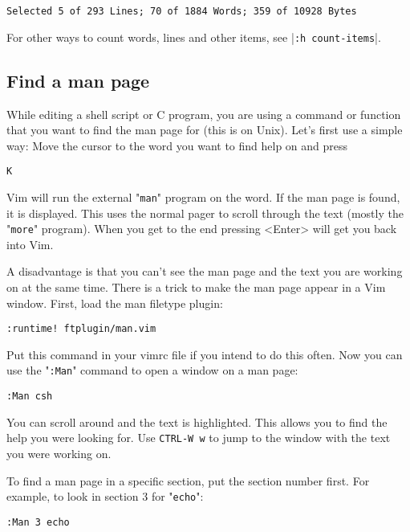 \begin{Verbatim}[samepage=true]
    Selected 5 of 293 Lines; 70 of 1884 Words; 359 of 10928 Bytes 
\end{Verbatim}

For other ways to count words, lines and other items, see |\verb!:h count-items!|.
\subsection{Find a man page}
\label{find-manpage}
While editing a shell script or C program, you are using a command or function that you want to find the man page for (this is on Unix).
Let's first use a simple way: Move the cursor to the word you want to find help on and press

\begin{Verbatim}[samepage=true]
 K
\end{Verbatim}

Vim will run the external "\verb!man!" program on the word.
If the man page is found, it is displayed.
This uses the normal pager to scroll through the text (mostly the "\verb!more!" program).
When you get to the end pressing <Enter> will get you back into Vim.

A disadvantage is that you can't see the man page and the text you are working on at the same time.
There is a trick to make the man page appear in a Vim window.
First, load the man filetype plugin:

\begin{Verbatim}[samepage=true]
 :runtime! ftplugin/man.vim
\end{Verbatim}

Put this command in your vimrc file if you intend to do this often.
Now you can use the "\verb!:Man!" command to open a window on a man page:

\begin{Verbatim}[samepage=true]
 :Man csh
\end{Verbatim}

You can scroll around and the text is highlighted.
This allows you to find the help you were looking for.
Use \verb!CTRL-W w! to jump to the window with the text you were working on.

To find a man page in a specific section, put the section number first.
For example, to look in section 3 for "\verb!echo!":

\begin{Verbatim}[samepage=true]
 :Man 3 echo
\end{Verbatim}


